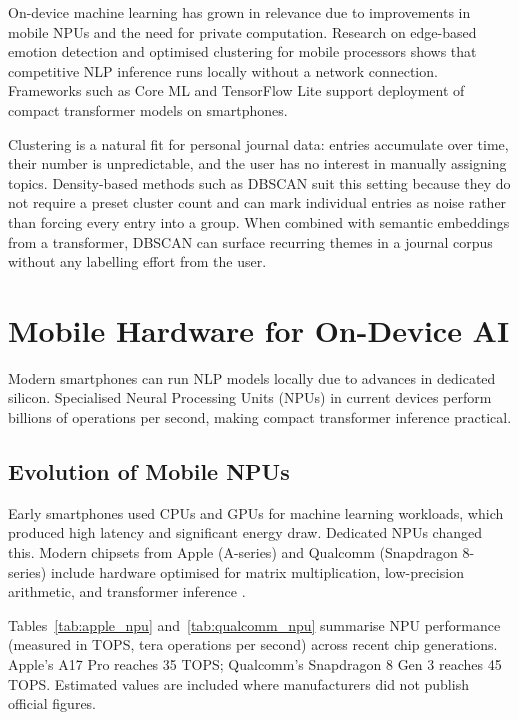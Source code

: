 On-device machine learning has grown in relevance due to improvements in mobile NPUs and the need for private computation. Research on edge-based emotion detection \cite{Pandelea2021EmotionEdge} and optimised clustering for mobile processors \cite{awad2022improved} shows that competitive NLP inference runs locally without a network connection. Frameworks such as Core ML and TensorFlow Lite support deployment of compact transformer models on smartphones.

Clustering is a natural fit for personal journal data: entries accumulate over time, their number is unpredictable, and the user has no interest in manually assigning topics. Density-based methods such as DBSCAN \cite{ester1996density} suit this setting because they do not require a preset cluster count and can mark individual entries as noise rather than forcing every entry into a group. When combined with semantic embeddings from a transformer, DBSCAN can surface recurring themes in a journal corpus without any labelling effort from the user.

\section{Mobile Hardware for On-Device AI}

Modern smartphones can run NLP models locally due to advances in dedicated silicon. Specialised Neural Processing Units (NPUs) in current devices perform billions of operations per second, making compact transformer inference practical.

\subsection{Evolution of Mobile NPUs}

Early smartphones used CPUs and GPUs for machine learning workloads, which produced high latency and significant energy draw. Dedicated NPUs changed this. Modern chipsets from Apple (A-series) and Qualcomm (Snapdragon 8-series) include hardware optimised for matrix multiplication, low-precision arithmetic, and transformer inference \cite{apple2023neuralengine,qualcomm2023hexagon}.

Tables~\ref{tab:apple_npu} and~\ref{tab:qualcomm_npu} summarise NPU performance (measured in TOPS, tera operations per second) across recent chip generations. Apple's A17 Pro reaches 35 TOPS; Qualcomm's Snapdragon 8 Gen 3 reaches 45 TOPS. Estimated values are included where manufacturers did not publish official figures.

